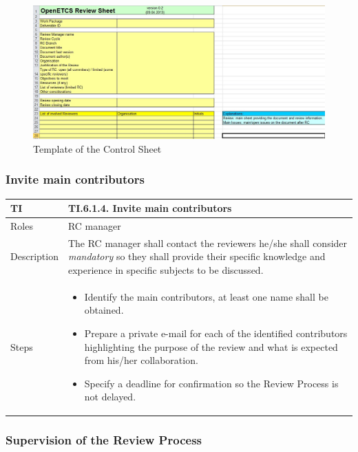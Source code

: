\documentclass{template/openetcs_article}
\begin{document}
\begin{figure}
\centering
\includegraphics [width=\textwidth]{./figures/ControlSheet.JPG}
\caption{Template of the Control Sheet}
\end{figure}

\subsubsection{Invite main contributors}

\begin{flushleft}
\tablefirsthead{}
\tablehead{}
\tabletail{}
\tablelasttail{}
\begin{supertabular}{|m{2cm}|m{13cm}|}
\hline
{}
TI & 
TI.6.1.4. Invite main contributors
\\\hline
Roles &
RC manager
\\\hline
Description &
The RC manager shall contact the reviewers he/she shall consider {\it mandatory} so they shall provide their specific knowledge and experience in specific subjects to be discussed.
\\\hline
Steps &
\begin{itemize}
\item Identify the main contributors, at least one name shall be obtained.
\item Prepare a private e-mail for each of the identified contributors highlighting the purpose of the review and what is expected from his/her collaboration.
\item Specify a deadline for confirmation so the Review Process is not delayed.
\end{itemize}
\\\hline
\end{supertabular}
\end{flushleft}

\subsubsection{Supervision of the Review Process}
\end{document}
